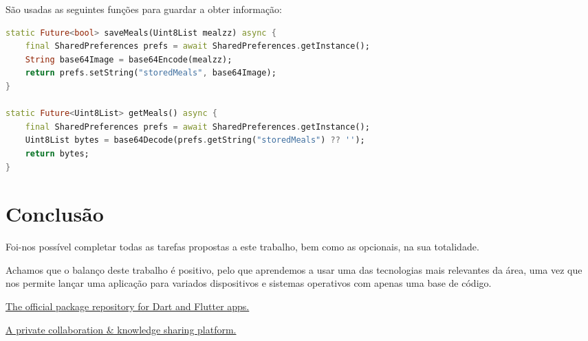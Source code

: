 \documentclass[10pt]{article}
\begin{document}
 São usadas as seguintes funções para guardar a obter informação:

\begin{lstlisting}[language=Dart]
static Future<bool> saveMeals(Uint8List mealzz) async {
    final SharedPreferences prefs = await SharedPreferences.getInstance();
    String base64Image = base64Encode(mealzz);
    return prefs.setString("storedMeals", base64Image);
}

static Future<Uint8List> getMeals() async {
    final SharedPreferences prefs = await SharedPreferences.getInstance();
    Uint8List bytes = base64Decode(prefs.getString("storedMeals") ?? '');
    return bytes;
}
\end{lstlisting}
 

\section{Conclusão} 

 	Foi-nos possível completar todas as tarefas propostas a este trabalho, bem como as opcionais, na sua totalidade.

  Achamos que o balanço deste trabalho é positivo, pelo que aprendemos a usar uma das tecnologias mais relevantes da área, uma vez que nos permite lançar uma aplicação para variados dispositivos e sistemas operativos com apenas uma base de código.


\begin{thebibliography}{1}
	\href{https://pub.dev}{The official package repository for Dart and Flutter apps.}

	\href{https://stackoverflow.com}{A private collaboration & knowledge sharing platform.}
\end{thebibliography}
\end{document}
